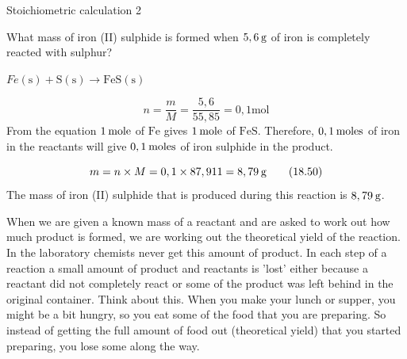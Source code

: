       \begin{wex}{Stoichiometric calculation 2 }
{
      \label{m38712*probfhsst!!!underscore!!!id1973}
      \label{m38712*id284347}What mass of iron (II) sulphide is formed when $5,6\phantom{\rule{2pt}{0ex}}\mathrm{g}$ of iron is completely reacted with sulphur?\par 
      \vspace{5pt} }
{
      \label{m38712*id284378}$Fe\left(\mathrm{s}\right)+\mathrm{S}\left(\mathrm{s}\right)\to \mathrm{FeS}\left(\mathrm{s}\right)$
      \par 
      \item  
      \label{m38712*id284430}\nopagebreak\noindent{}
        
    \begin{equation}
    n=\frac{m}{M}=\frac{5,6}{55,85}=0,1\mathrm{mol}\tag{18.49}
      \end{equation}
      \label{m38712*id284488}From the equation $1\phantom{\rule{2pt}{0ex}}\mathrm{mole}$ of $\mathrm{Fe}$ gives $1\phantom{\rule{2pt}{0ex}}\mathrm{mole}$ of $\mathrm{FeS}$. Therefore, $0,1\phantom{\rule{2pt}{0ex}}\mathrm{moles}$ of iron in the reactants will give $0,1\phantom{\rule{2pt}{0ex}}\mathrm{moles}$ of iron sulphide in the product.\par 
      \label{m38712*id284499}\nopagebreak\noindent{}
    \begin{equation}
    m=n\ensuremath{\times}M=0,1\ensuremath{\times}87,911=8,79\phantom{\rule{2pt}{0ex}}\mathrm{g}\tag{18.50}
      \end{equation}
      \label{m38712*id284548}The mass of iron (II) sulphide that is produced during this reaction is $8,79\phantom{\rule{2pt}{0ex}}\mathrm{g}$. \par 
}
    \end{wex}
    \noindent
\label{m38712*eip-943}When we are given a known mass of a reactant and are asked to work out how much product is formed, we are working out the theoretical yield of the reaction. In the laboratory chemists never get this amount of product. In each step of a reaction a small amount of product and reactants is 'lost' either because a reactant did not completely react or some of the product was left behind in the original container. Think about this. When you make your lunch or supper, you might be a bit hungry, so you eat some of the food that you are preparing. So instead of getting the full amount of food out (theoretical yield) that you started preparing, you lose some along the way. \par \label{m38712*secfhsst!!!underscore!!!id2067}\vspace{.5cm} 
